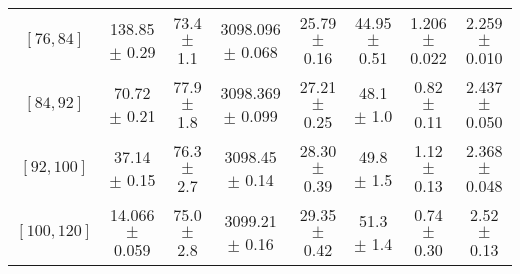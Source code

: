 \begin{tabular}{c||c|c|c|c|c|c|c}
$[76, 84]$ & 138.85 $\pm$ 0.29 & 73.4 $\pm$ 1.1 & 3098.096 $\pm$ 0.068 & 25.79 $\pm$ 0.16 & 44.95 $\pm$ 0.51 & 1.206 $\pm$ 0.022 & 2.259 $\pm$ 0.010\\
$[84, 92]$ & 70.72 $\pm$ 0.21 & 77.9 $\pm$ 1.8 & 3098.369 $\pm$ 0.099 & 27.21 $\pm$ 0.25 & 48.1 $\pm$ 1.0 & 0.82 $\pm$ 0.11 & 2.437 $\pm$ 0.050\\
$[92, 100]$ & 37.14 $\pm$ 0.15 & 76.3 $\pm$ 2.7 & 3098.45 $\pm$ 0.14 & 28.30 $\pm$ 0.39 & 49.8 $\pm$ 1.5 & 1.12 $\pm$ 0.13 & 2.368 $\pm$ 0.048\\
$[100, 120]$ & 14.066 $\pm$ 0.059 & 75.0 $\pm$ 2.8 & 3099.21 $\pm$ 0.16 & 29.35 $\pm$ 0.42 & 51.3 $\pm$ 1.4 & 0.74 $\pm$ 0.30 & 2.52 $\pm$ 0.13\\
\end{tabular}
